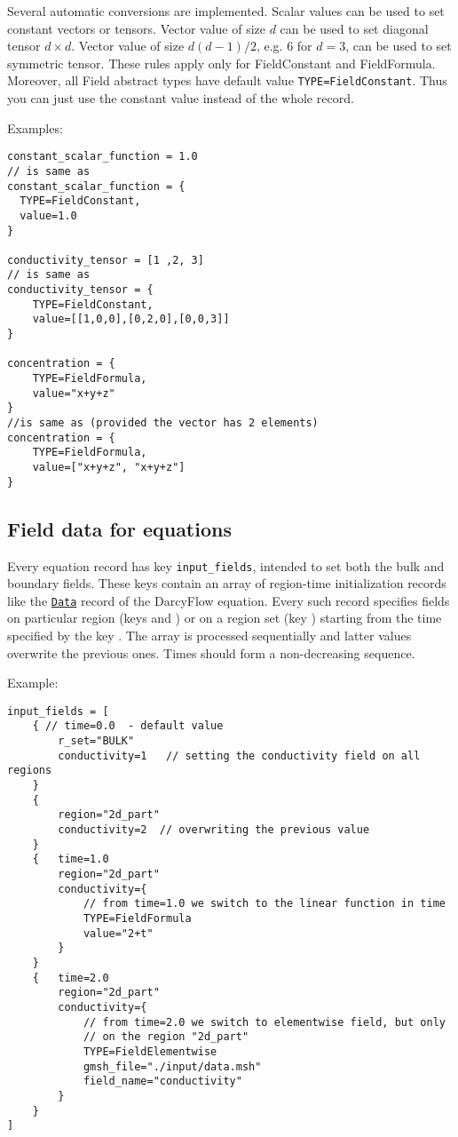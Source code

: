 Several automatic conversions are implemented. Scalar values can be used to set constant vectors or tensors. Vector value of size $d$ can be used to set diagonal tensor $d\times d$.
Vector value of size $d(d-1)/2$, e.g. $6$ for $d=3$, can be used to set symmetric tensor. These rules apply only for FieldConstant and FieldFormula.
Moreover, all Field abstract types have default value \verb'TYPE=FieldConstant'. Thus you can just use the constant value instead of the whole record.

Examples:
\begin{verbatim}
constant_scalar_function = 1.0
// is same as
constant_scalar_function = {
  TYPE=FieldConstant,
  value=1.0
}

conductivity_tensor = [1 ,2, 3]
// is same as
conductivity_tensor = {
    TYPE=FieldConstant,
    value=[[1,0,0],[0,2,0],[0,0,3]]
}

concentration = {
    TYPE=FieldFormula,
    value="x+y+z"
}
//is same as (provided the vector has 2 elements)
concentration = {
    TYPE=FieldFormula,
    value=["x+y+z", "x+y+z"]
}       
\end{verbatim}

\subsection{Field data for equations}
Every equation record has key \verb'input_fields', intended to set both the bulk and boundary fields. These keys contain an array of region-time initialization records
like the \hyperlink{IT::DarcyFlowMH-Data}{\tt Data} record of the DarcyFlow equation. Every such record specifies fields on particular region 
(keys  and  ) or on a region set 
(key ) starting from the time specified by the key .
The array is processed sequentially and latter values overwrite the previous ones. Times should form a non-decreasing sequence.

Example:
\begin{verbatim}
input_fields = [   
    { // time=0.0  - default value
        r_set="BULK"
        conductivity=1   // setting the conductivity field on all regions
    }
    {
        region="2d_part"
        conductivity=2  // overwriting the previous value
    }
    {   time=1.0
        region="2d_part"
        conductivity={
            // from time=1.0 we switch to the linear function in time
            TYPE=FieldFormula
            value="2+t"      
        }    
    }
    {   time=2.0
        region="2d_part"
        conductivity={
            // from time=2.0 we switch to elementwise field, but only
            // on the region "2d_part"
            TYPE=FieldElementwise
            gmsh_file="./input/data.msh"
            field_name="conductivity"
        }
    }    
]               
\end{verbatim}

